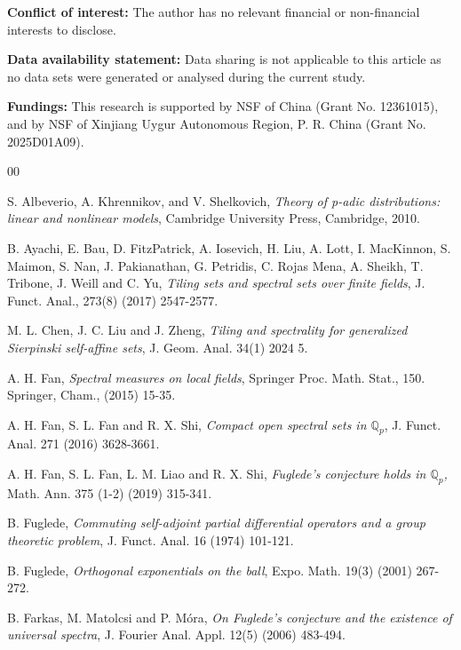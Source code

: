 \documentclass[a4paper,12pt]{amsart}
\begin{document}
\textbf{Conflict of interest:} The author has no relevant financial or non-financial interests to disclose.

\textbf{Data availability statement:} Data sharing is not applicable to this article as no data
sets were generated or analysed during the current study.

\textbf{Fundings:} This research is supported by NSF of China (Grant No. 12361015), and
by NSF of Xinjiang Uygur Autonomous Region, P. R. China (Grant No. 2025D01A09).





\begin{thebibliography}{00}

S. Albeverio, A. Khrennikov, and V. Shelkovich, {\em Theory of p-adic distributions:
	linear and nonlinear models}, Cambridge University Press, Cambridge, 2010.

B. Ayachi, E. Bau, D. FitzPatrick, A. Iosevich, H. Liu, A. Lott, I.
MacKinnon, S. Maimon, S. Nan, J. Pakianathan, G. Petridis, C. Rojas Mena,
A. Sheikh, T. Tribone, J. Weill and C. Yu,
{\em Tiling sets and spectral sets over finite fields}, J. Funct. Anal., 273(8) (2017) 2547-2577.


M. L. Chen,  J. C. Liu  and J. Zheng, {\em Tiling and spectrality for generalized Sierpinski
self-affine sets},  J.  Geom. Anal. 34(1) 2024 5.

A. H. Fan, {\em Spectral measures on local fields}, Springer Proc. Math. Stat., 150. Springer, Cham., (2015) 15-35.

A. H. Fan, S. L. Fan and R. X. Shi, {\em Compact open spectral sets in $\mathbb{Q}_p$},
J. Funct. Anal. 271 (2016) 3628-3661.

A. H. Fan, S. L. Fan, L. M. Liao and R. X. Shi, {\em Fuglede's conjecture  holds in $\mathbb{Q}_p$,}
Math. Ann. 375 (1-2) (2019) 315-341.


B. Fuglede, {\em Commuting self-adjoint partial differential operators and
a group theoretic problem}, J. Funct. Anal. 16 (1974) 101-121.

B. Fuglede, {\em Orthogonal exponentials on the ball}, Expo. Math. 19(3) (2001) 267-272.

B. Farkas, M. Matolcsi and P. M\'{o}ra, {\em On Fuglede's conjecture and the existence
of universal spectra}, J. Fourier Anal. Appl. 12(5) (2006) 483-494.



\end{thebibliography}
\end{document}
